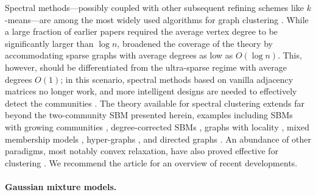 Spectral methods---possibly coupled with other subsequent refining schemes like
$k$-means---are among the most widely used algorithms for graph clustering
\citep{mcsherry2001spectral,rohe2011spectral,balakrishnan2011noise,chaudhuri2012spectral,fishkind2013consistent,sarkar2015role,jin2015fast,gao2017achieving,zhang2020theoretical,newman2013spectral,chen2015phase,zhang2020detecting,le2015estimating,jin2015fast,le2018concentration,chen2020global}.
While a large fraction of earlier papers required the average vertex degree  to be significantly larger than  $\log n$,
\citet{lei2015consistency} broadened the coverage of the theory by accommodating sparse graphs with average  degrees as low as $O(\log n)$. This, however, should be differentiated from the ultra-sparse regime with average degrees $O(1)$; in this scenario, spectral methods based on  vanilla adjacency matrices no longer work, and  more intelligent designs are needed  to effectively detect the communities \citep{coja2010graph,massoulie2014community,chin2015stochastic,le2015sparse}.
The theory available for spectral clustering extends far beyond the two-community SBM presented herein, examples including SBMs with growing communities \citep{rohe2011spectral}, degree-corrected SBMs \citep{lei2015consistency,lei2014generic}, graphs with locality \citep{chen2016community}, mixed membership models \citet{fan2019simple,han2019universal}, hyper-graphs \citep{ahn2018hypergraph,michoel2012alignment,cole2020exact}, and directed graphs \citep{wang2020spectral}. An abundance of other paradigms, most notably convex relaxation, have also proved effective for clustering \citep{jalali2011clustering,amini2013pseudo,abbe2014exact,hajek2015achieving,cai2015robust,zhao2012consistency,li2018convex,zhang2020theoretical,yuan2018community,fei2018exponential,fei2019achieving}. We recommend the article \citet{abbe2017community} for an overview of recent developments.






 \paragraph{Gaussian mixture models.}

